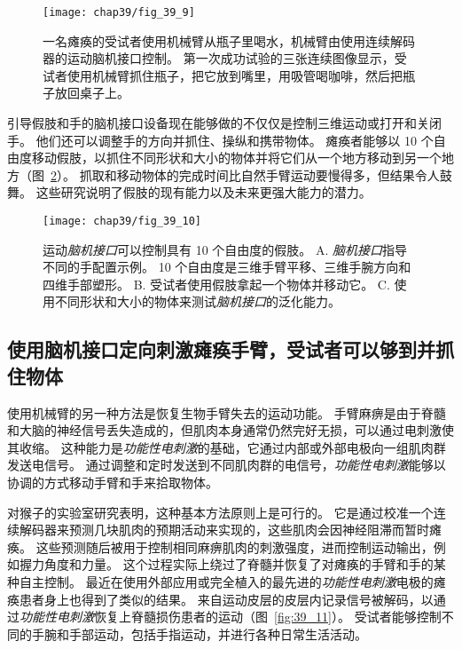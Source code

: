 \begin{figure}[htbp]
	\centering
	\texttt{[image: chap39/fig\_39\_9]}
	\caption{一名瘫痪的受试者使用机械臂从瓶子里喝水，机械臂由使用连续解码器的运动脑机接口控制。 
		第一次成功试验的三张连续图像显示，受试者使用机械臂抓住瓶子，把它放到嘴里，用吸管喝咖啡，然后把瓶子放回桌子上\cite{hochberg2012reach}。}
	\label{fig:39_9}
\end{figure}


引导假肢和手的脑机接口设备现在能够做的不仅仅是控制三维运动或打开和关闭手。
他们还可以调整手的方向并抓住、操纵和携带物体。
瘫痪者能够以 10 个自由度移动假肢，以抓住不同形状和大小的物体并将它们从一个地方移动到另一个地方（图~\ref{fig:39_10}）。
抓取和移动物体的完成时间比自然手臂运动要慢得多，但结果令人鼓舞。
这些研究说明了假肢的现有能力以及未来更强大能力的潜力。


\begin{figure}[htbp]
	\centering
	\texttt{[image: chap39/fig\_39\_10]}
	\caption{运动\textit{脑机接口}可以控制具有 10 个自由度的假肢。 
		A. \textit{脑机接口}指导不同的手配置示例。
		10 个自由度是三维手臂平移、三维手腕方向和四维手部塑形。
		B. 受试者使用假肢拿起一个物体并移动它。
		C. 使用不同形状和大小的物体来测试\textit{脑机接口}的泛化能力\cite{wodlinger2014ten}。}
	\label{fig:39_10}
\end{figure}



\subsection{使用脑机接口定向刺激瘫痪手臂，受试者可以够到并抓住物体}

使用机械臂的另一种方法是恢复生物手臂失去的运动功能。
手臂麻痹是由于脊髓和大脑的神经信号丢失造成的，但肌肉本身通常仍然完好无损，可以通过电刺激使其收缩。
这种能力是\textit{功能性电刺激}的基础，它通过内部或外部电极向一组肌肉群发送电信号。
通过调整和定时发送到不同肌肉群的电信号，\textit{功能性电刺激}能够以协调的方式移动手臂和手来拾取物体。


对猴子的实验室研究表明，这种基本方法原则上是可行的。
它是通过校准一个连续解码器来预测几块肌肉的预期活动来实现的，这些肌肉会因神经阻滞而暂时瘫痪。
这些预测随后被用于控制相同麻痹肌肉的刺激强度，进而控制运动输出，例如握力角度和力量。
这个过程实际上绕过了脊髓并恢复了对瘫痪的手臂和手的某种自主控制。
最近在使用外部应用或完全植入的最先进的\textit{功能性电刺激}电极的瘫痪患者身上也得到了类似的结果。
来自运动皮层的皮层内记录信号被解码，以通过\textit{功能性电刺激}恢复上脊髓损伤患者的运动（图~\ref{fig:39_11}）。
受试者能够控制不同的手腕和手部运动，包括手指运动，并进行各种日常生活活动。


